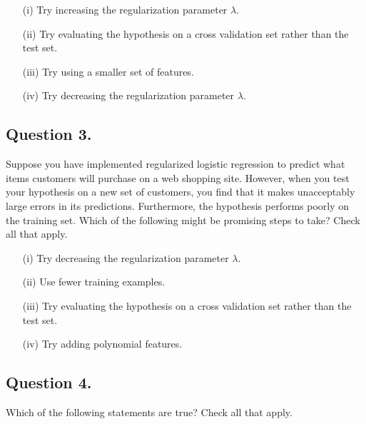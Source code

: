 \documentclass[11pt]{article} %
\begin{document}
\begin{itemize}
\item[(i)] 
Try increasing the regularization parameter $\lambda$.
\item[(ii)] 
Try evaluating the hypothesis on a cross validation set rather than the test set.
\item[(iii)] 
Try using a smaller set of features.
\item[(iv)] 
Try decreasing the regularization parameter $\lambda$.
\end{itemize}
\subsection*{Question 3. }
Suppose you have implemented regularized logistic regression to predict what items customers will purchase on a web shopping site. However, when you test your hypothesis on a new set of customers, you find that it makes unacceptably large errors in its predictions. Furthermore, the hypothesis performs poorly on the training set. Which of the following might be promising steps to take? Check all that apply.

\begin{itemize}
\item[(i)] Try decreasing the regularization parameter $\lambda$.

\item[(ii)] Use fewer training examples.

\item[(iii)] Try evaluating the hypothesis on a cross validation set rather than the test set.

\item[(iv)] Try adding polynomial features.
\end{itemize}
\subsection*{Question 4. }
Which of the following statements are true? Check all that apply.
\end{document}
